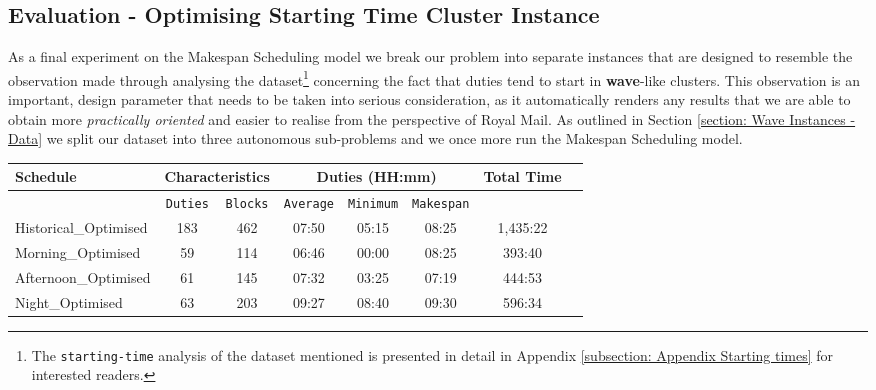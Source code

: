 
\subsection*{Evaluation - Optimising Starting Time Cluster Instance}
As a final experiment on the Makespan Scheduling model we break our problem into separate instances that are designed to resemble the observation made through analysing the dataset\footnote{The \texttt{starting-time} analysis of the dataset mentioned is presented in detail in Appendix \ref{subsection: Appendix Starting times} for interested readers.} concerning the fact that duties tend to start in \textbf{wave}-like clusters. This observation is an important, design parameter that needs to be taken into serious consideration, as it automatically renders any results that we are able to obtain more \textit{practically oriented} and easier to realise from the perspective of Royal Mail. As outlined in Section \ref{section: Wave Instances - Data} we split our dataset into three autonomous sub-problems and we once more run the Makespan Scheduling model.


\begin{table}[h]
\small
    \centering 
    \begin{tabular}{|l|c|c|c|c|c|c|c|}
        \hline
        \textbf{Schedule} & \multicolumn{2}{|c|}{ \textbf{Characteristics}} & \multicolumn{3}{|c|}{ \textbf{Duties (HH:mm)}} & \textbf{Total Time}  \\
        \hline
        & \texttt{Duties} & \texttt{Blocks} & \texttt{Average} &  \texttt{Minimum} & \texttt{Makespan} & \\
        \hline
        Historical\_Optimised & 183 & 462  & 07:50 & 05:15 & 08:25 & 1,435:22 \\
        \hline
        Morning\_Optimised & 59 & 114 & 06:46 & 00:00 & 08:25 & 393:40 \\
        \hline
        Afternoon\_Optimised & 61 & 145 & 07:32 & 03:25 & 07:19 & 444:53 \\
        \hline
        Night\_Optimised & 63 & 203 & 09:27 & 08:40 & 09:30 & 596:34 \\
        \hline
    \end{tabular}%
    \medbreak
\end{table}

